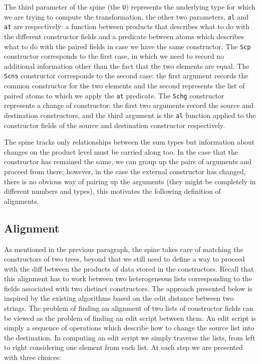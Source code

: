 \documentclass[11pt]{article}
\begin{document}
The third parameter of the spine (the \texttt{U}) represents the
underlying type for which we are trying to compute the transformation,
the other two parameters, \texttt{al} and \texttt{at} are respectively: a
function between products that describes what to do with the different
constructor fields and a predicate between atoms which describes what to
do with the paired fields in case we have the same constructor. The
\texttt{Scp} constructor corresponds to the first case, in which we need
to record no additional information other than the fact that the two
elements are equal. The \texttt{Scns} constructor corresponds to the
second case: the first argument records the common constructor for the
two elements and the second represents the list of paired atoms to which
we apply the \texttt{at} predicate. The \texttt{Schg} constructor
represents a change of constructor: the first two arguments record the
source and destination constructors, and the third argument is the
\texttt{al} function applied to the constructor fields of the source and
destination constructor respectively.

The spine tracks only relationships between the sum types but information
about changes on the product level must be carried along too. In the
case that the constructor has remained the same, we can group up the
pairs of arguments and proceed from there; however, in the case the
external constructor has changed, there is no obvious way of pairing up
the arguments (they might be completely in different numbers and types), this 
motivates the following definition of alignments.

\subsection{Alignment}\label{alignment}

As mentioned in the previous paragraph, the spine takes care of matching
the constructors of two trees, beyond that we still need to define a way
to proceed with the diff between the products of data stored in the constructors.
Recall that this alignment has to work between two heterogeneous lists
corresponding to the fields associated with two distinct constructors.
The approach presented below is inspired by the existing algorithms
based on the edit distance between two strings. The problem of finding
an alignment of two lists of constructor fields can be viewed as the
problem of finding an edit script between them. An edit script is
simply a sequence of operations which describe how to change the source
list into the destination. In computing an edit script we simply
traverse the lists, from left to right considering one element from each
list. At each step we are presented with three choices:
\end{document}

